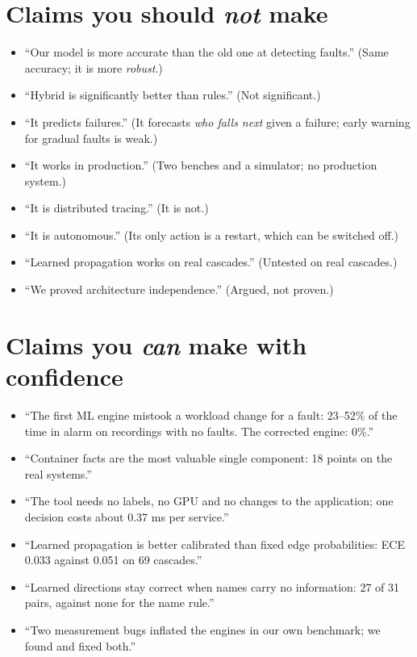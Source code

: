 \section{Claims you should \emph{not} make}
\begin{warnbox}
\begin{itemize}
\item ``Our model is more accurate than the old one at detecting faults.'' (Same accuracy; it is more \emph{robust}.)
\item ``Hybrid is significantly better than rules.'' (Not significant.)
\item ``It predicts failures.'' (It forecasts \emph{who falls next} given a failure; early warning for gradual faults is weak.)
\item ``It works in production.'' (Two benches and a simulator; no production system.)
\item ``It is distributed tracing.'' (It is not.)
\item ``It is autonomous.'' (Its only action is a restart, which can be switched off.)
\item ``Learned propagation works on real cascades.'' (Untested on real cascades.)
\item ``We proved architecture independence.'' (Argued, not proven.)
\end{itemize}
\end{warnbox}

\section{Claims you \emph{can} make with confidence}
\begin{saybox}
\begin{itemize}
\item ``The first ML engine mistook a workload change for a fault: 23--52\% of the time in alarm on recordings with no faults. The corrected engine: 0\%.''
\item ``Container facts are the most valuable single component: 18 points on the real systems.''
\item ``The tool needs no labels, no GPU and no changes to the application; one decision costs about 0.37 ms per service.''
\item ``Learned propagation is better calibrated than fixed edge probabilities: ECE 0.033 against 0.051 on 69 cascades.''
\item ``Learned directions stay correct when names carry no information: 27 of 31 pairs, against none for the name rule.''
\item ``Two measurement bugs inflated the engines in our own benchmark; we found and fixed both.''
\end{itemize}
\end{saybox}
